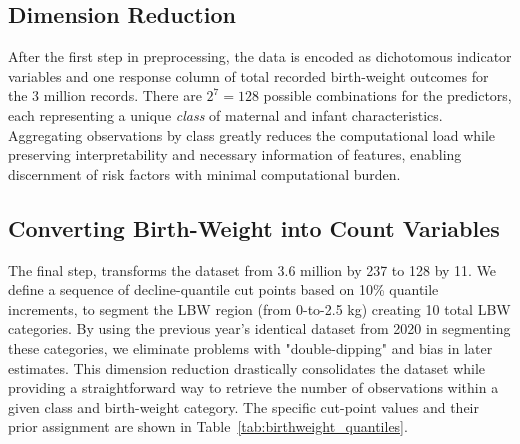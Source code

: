 \subsection{Dimension Reduction}
\label{sec:ch2-dimension-reduction}

After the first step in preprocessing, the data is encoded as dichotomous indicator variables and one response column of total recorded birth-weight outcomes for the 3 million records. There are \(2^7 = 128\) possible combinations for the predictors, each representing a unique \emph{class} of maternal and infant characteristics. Aggregating observations by class greatly reduces the computational load while preserving interpretability and necessary information of features, enabling discernment of risk factors with minimal computational burden.

\subsection{Converting Birth-Weight into Count Variables} 
\label{sec:ch2-count-variables}

The final step, transforms the dataset from 3.6 million by 237 to 128 by 11. We define a sequence of decline-quantile cut points based on 10\% quantile increments, to segment the LBW region (from 0-to-2.5 kg) creating 10 total LBW categories. By using the previous year's identical dataset from 2020 in segmenting these categories, we eliminate problems with "double-dipping" and bias in later estimates. This dimension reduction drastically consolidates the dataset while providing a straightforward way to retrieve the number of observations within a given class and birth-weight category. The specific cut-point values and their prior assignment are shown in Table~\ref{tab:birthweight_quantiles}.

